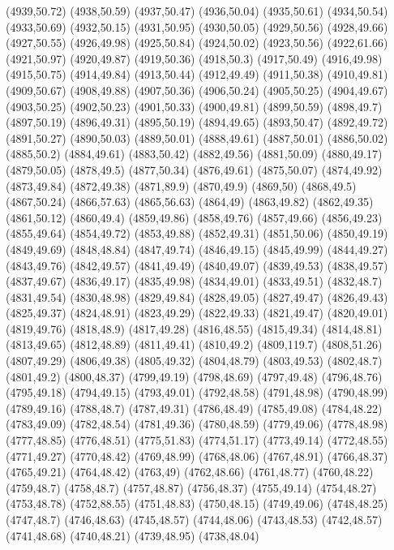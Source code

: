(4939,50.72)
(4938,50.59)
(4937,50.47)
(4936,50.04)
(4935,50.61)
(4934,50.54)
(4933,50.69)
(4932,50.15)
(4931,50.95)
(4930,50.05)
(4929,50.56)
(4928,49.66)
(4927,50.55)
(4926,49.98)
(4925,50.84)
(4924,50.02)
(4923,50.56)
(4922,61.66)
(4921,50.97)
(4920,49.87)
(4919,50.36)
(4918,50.3)
(4917,50.49)
(4916,49.98)
(4915,50.75)
(4914,49.84)
(4913,50.44)
(4912,49.49)
(4911,50.38)
(4910,49.81)
(4909,50.67)
(4908,49.88)
(4907,50.36)
(4906,50.24)
(4905,50.25)
(4904,49.67)
(4903,50.25)
(4902,50.23)
(4901,50.33)
(4900,49.81)
(4899,50.59)
(4898,49.7)
(4897,50.19)
(4896,49.31)
(4895,50.19)
(4894,49.65)
(4893,50.47)
(4892,49.72)
(4891,50.27)
(4890,50.03)
(4889,50.01)
(4888,49.61)
(4887,50.01)
(4886,50.02)
(4885,50.2)
(4884,49.61)
(4883,50.42)
(4882,49.56)
(4881,50.09)
(4880,49.17)
(4879,50.05)
(4878,49.5)
(4877,50.34)
(4876,49.61)
(4875,50.07)
(4874,49.92)
(4873,49.84)
(4872,49.38)
(4871,89.9)
(4870,49.9)
(4869,50)
(4868,49.5)
(4867,50.24)
(4866,57.63)
(4865,56.63)
(4864,49)
(4863,49.82)
(4862,49.35)
(4861,50.12)
(4860,49.4)
(4859,49.86)
(4858,49.76)
(4857,49.66)
(4856,49.23)
(4855,49.64)
(4854,49.72)
(4853,49.88)
(4852,49.31)
(4851,50.06)
(4850,49.19)
(4849,49.69)
(4848,48.84)
(4847,49.74)
(4846,49.15)
(4845,49.99)
(4844,49.27)
(4843,49.76)
(4842,49.57)
(4841,49.49)
(4840,49.07)
(4839,49.53)
(4838,49.57)
(4837,49.67)
(4836,49.17)
(4835,49.98)
(4834,49.01)
(4833,49.51)
(4832,48.7)
(4831,49.54)
(4830,48.98)
(4829,49.84)
(4828,49.05)
(4827,49.47)
(4826,49.43)
(4825,49.37)
(4824,48.91)
(4823,49.29)
(4822,49.33)
(4821,49.47)
(4820,49.01)
(4819,49.76)
(4818,48.9)
(4817,49.28)
(4816,48.55)
(4815,49.34)
(4814,48.81)
(4813,49.65)
(4812,48.89)
(4811,49.41)
(4810,49.2)
(4809,119.7)
(4808,51.26)
(4807,49.29)
(4806,49.38)
(4805,49.32)
(4804,48.79)
(4803,49.53)
(4802,48.7)
(4801,49.2)
(4800,48.37)
(4799,49.19)
(4798,48.69)
(4797,49.48)
(4796,48.76)
(4795,49.18)
(4794,49.15)
(4793,49.01)
(4792,48.58)
(4791,48.98)
(4790,48.99)
(4789,49.16)
(4788,48.7)
(4787,49.31)
(4786,48.49)
(4785,49.08)
(4784,48.22)
(4783,49.09)
(4782,48.54)
(4781,49.36)
(4780,48.59)
(4779,49.06)
(4778,48.98)
(4777,48.85)
(4776,48.51)
(4775,51.83)
(4774,51.17)
(4773,49.14)
(4772,48.55)
(4771,49.27)
(4770,48.42)
(4769,48.99)
(4768,48.06)
(4767,48.91)
(4766,48.37)
(4765,49.21)
(4764,48.42)
(4763,49)
(4762,48.66)
(4761,48.77)
(4760,48.22)
(4759,48.7)
(4758,48.7)
(4757,48.87)
(4756,48.37)
(4755,49.14)
(4754,48.27)
(4753,48.78)
(4752,88.55)
(4751,48.83)
(4750,48.15)
(4749,49.06)
(4748,48.25)
(4747,48.7)
(4746,48.63)
(4745,48.57)
(4744,48.06)
(4743,48.53)
(4742,48.57)
(4741,48.68)
(4740,48.21)
(4739,48.95)
(4738,48.04)
